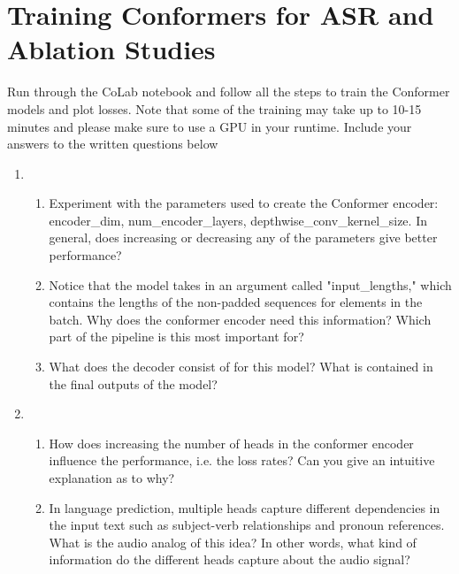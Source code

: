 \documentclass{article}
\begin{document}
\newpage
\thispagestyle{plain}
\section{Training Conformers for ASR and Ablation Studies}
Run through the CoLab notebook \href{https://colab.research.google.com/drive/1h_ML3mGcVd3opaa2ctxL3ZnuI2LV1uyz?usp=sharing}{\color{blue}{Conformers\_ASR.ipynb}} and follow all the steps to train the Conformer models and plot losses. Note that some of the training may take up to 10-15 minutes and please make sure to use a GPU in your runtime. Include your answers to the written questions below
\newline
\begin{enumerate}[label=(\alph*)]
\item\mbox{}\\
\begin{enumerate}[label=(\roman*)]
    \item Experiment with the parameters used to create the Conformer encoder: \newline encoder\_dim, num\_encoder\_layers, depthwise\_conv\_kernel\_size. In general, does increasing or decreasing any of the parameters give better performance?

    \item Notice that the model takes in an argument called "input\_lengths," which contains the lengths of the non-padded sequences for elements in the batch. Why does the conformer encoder need this information? Which part of the pipeline is this most important for?

    \item What does the decoder consist of for this model? What is contained in the final outputs of the model?

    
\end{enumerate}
\item\mbox{}\\ 
\begin{enumerate}[label=(\roman*)]
    \item How does increasing the number of heads in the conformer encoder influence the performance, i.e. the loss rates? Can you give an intuitive explanation as to why?
    
    \item In language prediction, multiple heads capture different dependencies in the input text such as subject-verb relationships and pronoun references. What is the audio analog of this idea? In other words, what kind of information do the different heads capture about the audio signal?


\end{enumerate}
\end{enumerate}
\end{document}
